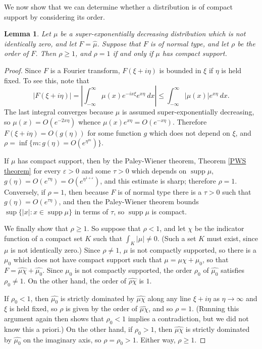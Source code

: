 \documentclass[12pt]{report}
\DeclareMathOperator{\supp}{supp}
\newtheorem{lemma}[theorem]{Lemma}
\theoremstyle{definition}
\begin{document}
    We now show that we can determine whether a distribution is of compact support by considering its order.
    \begin{lemma}
    Let $\mu$ be a super-exponentially decreasing distribution which is not identically zero, and let $F = \hat \mu$. Suppose that $F$ is of normal type, and let $\rho$ be the order of $F$. Then $\rho \geq 1$, and $\rho = 1$ if and only if $\mu$ has compact support.
    \end{lemma}
    \begin{proof}
    Since $F$ is a Fourier transform, $F(\xi + i\eta)$ is bounded in $\xi$ if $\eta$ is held fixed. To see this, note that
    $$|F(\xi + i\eta)| = \left|\int_{-\infty}^\infty \mu(x)e^{-ix\xi}e^{x\eta} ~dx\right| \leq \int_{-\infty}^\infty |\mu(x)| e^{x\eta} ~dx.$$
    The last integral converges because $\mu$ is assumed super-exponentially decreasing, so $\mu(x) = O(e^{-2x\eta})$ whence $\mu(x)e^{x\eta} = O(e^{-x\eta})$.
    Therefore $F(\xi + i\eta) = O(g(\eta))$ for some function $g$ which does not depend on $\xi$, and $\rho = \inf \{m: g(\eta) = O(e^{\eta^m})\}$.

    If $\mu$ has compact support, then by the Paley-Wiener theorem, Theorem \ref{PWS theorem} for every $\varepsilon > 0$ and some $\tau > 0$ which depends on $\supp \mu$, $g(\eta) = O(e^{\tau\eta}) = O(e^{\eta^{1+\varepsilon}})$, and this estimate is sharp; therefore $\rho = 1$.
    Conversely, if $\rho = 1$, then because $F$ is of normal type there is a $\tau > 0$ such that $g(\eta) = O(e^{\tau\eta})$, and then the Paley-Wiener theorem bounds $\sup\{|x|: x \in \supp \mu\}$ in terms of $\tau$, so $\supp \mu$ is compact.

    We finally show that $\rho \geq 1$. So suppose that $\rho < 1$, and let $\chi$ be the indicator function of a compact set $K$ such that $\int_K |\mu| \neq 0$. (Such a set $K$ must exist, since $\mu$ is not identically zero.)
    Since $\rho \neq 1$, $\mu$ is not compactly supported, so there is a $\mu_0$ which does not have compact support such that $\mu = \mu\chi + \mu_0$, so that $F = \widehat{\mu\chi} + \widehat{\mu_0}$.
    Since $\mu_0$ is not compactly supported, the order $\rho_0$ of $\widehat{\mu_0}$ satisfies $\rho_0 \neq 1$.
    On the other hand, the order of $\widehat{\rho\chi}$ is $1$.

    If $\rho_0 < 1$, then $\widehat{\mu_0}$ is strictly dominated by $\widehat{\mu\chi}$ along any line $\xi + i\eta$ as $\eta \to \infty$ and $\xi$ is held fixed, so $\rho$ is given by the order of $\widehat{\mu\chi}$, and so $\rho = 1$. (Running this argument again then shows that $\rho_0 < 1$ implies a contradiction, but we did not know this a priori.)
    On the other hand, if $\rho_0 > 1$, then $\widehat{\mu\chi}$ is strictly dominated by $\widehat{\mu_0}$ on the imaginary axis, so $\rho = \rho_0 > 1$.
    Either way, $\rho \geq 1$.
    \end{proof}
\end{document}
